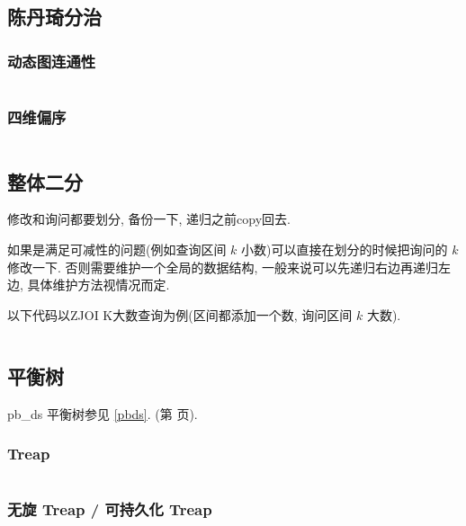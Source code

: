 \documentclass[a4paper, twoside]{article}
\begin{document}
\begin{multicols}{2}
					
	
			\subsection{陈丹琦分治}
				\subsubsection[动态图连通性（分治并查集）]{动态图连通性}
					\inputminted{cpp}{../src/datastructure/分治并查集.cpp}

				\subsubsection{四维偏序}
					\inputminted{cpp}{../src/datastructure/CDQ分治.cpp}
	
			\subsection{整体二分}
				修改和询问都要划分, 备份一下, 递归之前copy回去.

				如果是满足可减性的问题(例如查询区间 $k$ 小数)可以直接在划分的时候把询问的 $k$ 修改一下. 否则需要维护一个全局的数据结构, 一般来说可以先递归右边再递归左边, 具体维护方法视情况而定.

				以下代码以ZJOI K大数查询为例(区间都添加一个数, 询问区间 $k$ 大数).

				\inputminted{cpp}{../src/datastructure/整体二分.cpp}

	
	
			\subsection{平衡树}
				pb\_ds 平衡树参见 \ref{pbds}. (第 \pageref{pbds} 页).

				\subsubsection{Treap}
					\inputminted{cpp}{../src/datastructure/Treap.cpp}
					
				\subsubsection{无旋 Treap / 可持久化 Treap}
					\inputminted{cpp}{../src/datastructure/无旋Treap.cpp}
		

\end{multicols}
\end{document}
